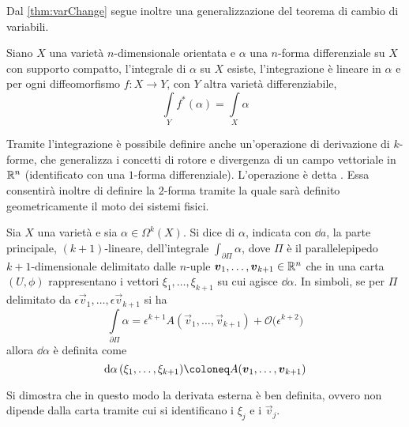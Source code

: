Dal \autoref{thm:varChange} segue inoltre una generalizzazione del teorema di cambio di variabili.
\begin{theorem}
  Siano $X$ una varietà $n$-dimensionale orientata e $\alpha$ una $n$-forma differenziale su $X$ con supporto compatto, l'integrale di $\alpha$ su $X$ esiste, l'integrazione è lineare in $\alpha$ e per ogni diffeomorfismo $f:X\to Y$, con $Y$ altra varietà differenziabile,
  \begin{equation}
  \int\limits_Y f^*(\alpha) = \int\limits_X \alpha
  \end{equation} 
\end{theorem}

Tramite l'integrazione è possibile definire anche un'operazione di derivazione di $k$-forme, che generalizza i concetti di rotore e divergenza di un campo vettoriale in $\mathbb{R}^{n}$ (identificato con una $1$-forma differenziale). L'operazione è detta . Essa consentirà inoltre di definire la $2$-forma tramite la quale sarà definito geometricamente il moto dei sistemi fisici. 
\begin{definition}
  Sia $X$ una varietà e sia $\alpha \in \Omega^k(X)$. Si dice  di $\alpha$, indicata con $\dd{a}$, la parte principale, $(k+1)$-lineare, dell'integrale $\int_{\partial \Pi} \alpha$, dove $\Pi$ è il parallelepipedo $k+1$-dimensionale delimitato dalle $n$-uple $\boldsymbol{v}_1, \ldots, \boldsymbol{v}_{k+1} \in \mathbb{R}^{n}$ che in una carta $(U, \phi)$ rappresentano i vettori $\xi_1, \ldots, \xi_{k+1}$ su cui agisce $\dd\alpha$. In simboli, se per $\Pi$ delimitato da $\epsilon \vec{v}_1, \ldots, \epsilon \vec{v}_{k+1}$ si ha \begin{equation}
    \int\limits_{\partial \Pi} \alpha = \epsilon^{k+1} A(\vec{v}_1, \ldots, \vec{v}_{k+1}) + \mathcal{O}\big(\epsilon^{k+2}\big)
  \end{equation}
  allora $\dd\alpha$ è definita come \begin{equation}
  \dd{\alpha}(\xi_1, \ldots, \xi_{k+1}) \defeq A(\vec{v}_1, \ldots, \vec{v}_{k+1})
  \end{equation} 
\end{definition}
\begin{remark}
  Si dimostra che in questo modo la derivata esterna è ben definita, ovvero non dipende dalla carta tramite cui si identificano i $\xi_j$ e i $\vec{v}_j$.
\end{remark}

